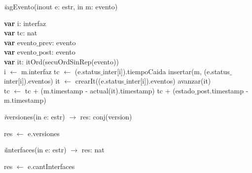 \textit{i}agEvento(inout e: estr, in m: evento)\\
\begin{algorithm}[H]
\BlankLine
\textbf{var} i: interfaz\\
\textbf{var} tc: nat\\
\textbf{var} evento$\_$prev: evento\\
\textbf{var} evento$\_$post: evento\\
\textbf{var} it: itOrd(secuOrdSinRep(evento)) \\
\BlankLine
i $\leftarrow$ m.interfaz
\BlankLine
tc $\leftarrow$ (e.status$\_$inter[i]).tiempoCaida
\BlankLine
insertar(m, (e.status$\_$inter[i]).eventos)
\BlankLine
it $\leftarrow$ crearIt((e.status$\_$inter[i]).eventos)
\BlankLine
{}
	{avanzar(it)\\
	 	{tc $\leftarrow$ tc + (m.timestamp - actual(it).timestamp)}
	}
\BlankLine
{}
	\BlankLine
		{tc + (estado$\_$post.timestamp - m.timestamp)}
\end{algorithm}

\vspace{11pt}

\textit{i}versiones(in e: estr) $\longrightarrow$ res: conj(version)\\
\begin{algorithm}[H]
\BlankLine
res $\leftarrow$ e.versiones
\end{algorithm}

\vspace{11pt}

\textit{i}interfaces(in e: estr) $\longrightarrow$ res: nat\\
\begin{algorithm}[H]
\BlankLine
res $\leftarrow$ e.cantInterfaces 
\end{algorithm}

